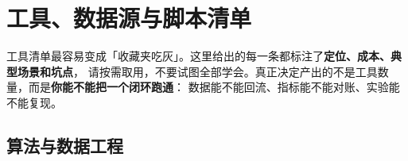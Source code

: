 \chapter{工具、数据源与脚本清单}
\label{app:tools}

\begin{insight}[先说清楚一件事]
工具清单最容易变成「收藏夹吃灰」。这里给出的每一条都标注了\textbf{定位、成本、典型场景和坑点}，
请按需取用，不要试图全部学会。真正决定产出的不是工具数量，而是\textbf{你能不能把一个闭环跑通}：
数据能不能回流、指标能不能对账、实验能不能复现。
\end{insight}

\section{算法与数据工程}


